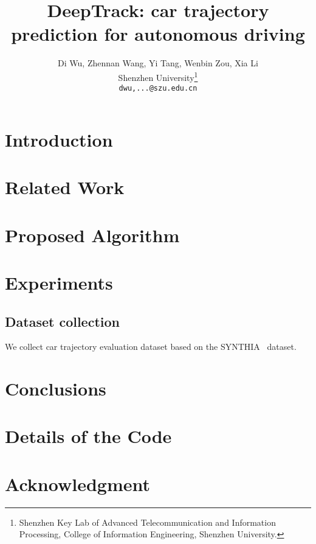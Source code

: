 \documentclass[10pt,twocolumn,letterpaper]{article}
\begin{document}
\title{DeepTrack: car trajectory prediction for autonomous driving}

\author{Di Wu, Zhennan Wang, Yi Tang,  Wenbin Zou, Xia Li\\
Shenzhen University\thanks{Shenzhen Key Lab of Advanced Telecommunication and Information Processing, College of Information Engineering, Shenzhen University.}\\
{\tt\small dwu,...@szu.edu.cn}}
\maketitle
\begin{abstract}


\end{abstract}
\section{Introduction} 

\section{Related Work}

\section{Proposed Algorithm}

\section{Experiments}
\subsection{Dataset collection}
We collect car trajectory evaluation dataset based on the SYNTHIA~\cite{ros2016synthia} dataset. 


\section{Conclusions}



\section*{Details of the Code}


\section*{Acknowledgment}

{\small


}
\end{document}
